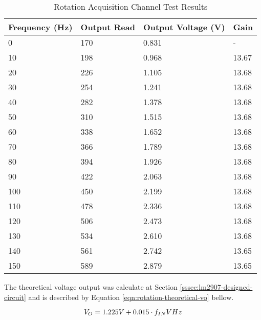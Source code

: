 			\begin{table}[h!]
				\begin{tabular}{|l|l|l|l|}
					\hline
					\textbf{Frequency (Hz)} & \textbf{Output Read} & \textbf{Output Voltage (V)} & \textbf{Gain} \\ \hline
					0 & 170 & 0.831 & - \\ \hline
					10 & 198 & 0.968 & 13.67 \\ \hline
					20 & 226 & 1.105 & 13.68 \\ \hline
					30 & 254 & 1.241 & 13.68 \\ \hline
					40 & 282 & 1.378 & 13.68 \\ \hline
					50 & 310 & 1.515 & 13.68 \\ \hline
					60 & 338 & 1.652 & 13.68 \\ \hline
					70 & 366 & 1.789 & 13.68 \\ \hline
					80 & 394 & 1.926 & 13.68 \\ \hline
					90 & 422 & 2.063 & 13.68 \\ \hline
					100 & 450 & 2.199 & 13.68 \\ \hline
					110 & 478 & 2.336 & 13.68 \\ \hline
					120 & 506 & 2.473 & 13.68 \\ \hline
					130 & 534 & 2.610 & 13.68 \\ \hline
					140 & 561 & 2.742 & 13.65 \\ \hline
					150 & 589 & 2.879 & 13.65 \\ \hline
				\end{tabular}
				\caption{Rotation Acquisition Channel Test Results}
				\label{table:results-rotation-test}
			\end{table}

		The theoretical voltage output was calculate at Section \ref{sssec:lm2907-designed-circuit} and is described by Equation \ref{eqn:rotation-theoretical-vo} bellow.

			\begin{equation}\label{eqn:rotation-theoretical-vo}
				V_{O}=1.225V + 0.015 \cdot f_{IN}   V\/Hz
			\end{equation}

